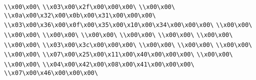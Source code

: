 \verb|\\x00\x00\|\newline
\verb|\\x03\x00\x2f\x00\x00\x00\|\newline
\verb|\\x00\x00\|\newline
\verb|\\x0a\x00\x32\x00\x0b\x00\x31\x00\x00\x00\|\newline
\verb|\\x03\x00\x36\x00\x0f\x00\x35\x00\x10\x00\x34\x00\x00\x00\|\newline
\verb|\\x00\x00\|\newline
\verb|\\x00\x00\|\newline
\verb|\\x00\x00\|\newline
\verb|\\x00\x00\|\newline
\verb|\\x00\x00\|\newline
\verb|\\x00\x00\|\newline
\verb|\\x00\x00\|\newline
\verb|\\x00\x00\|\newline
\verb|\\x03\x00\x3c\x00\x00\x00\|\newline
\verb|\\x00\x00\|\newline
\verb|\\x00\x00\|\newline
\verb|\\x00\x00\|\newline
\verb|\\x00\x00\|\newline
\verb|\\x07\x00\x25\x00\x11\x00\x40\x00\x00\x00\|\newline
\verb|\\x00\x00\|\newline
\verb|\\x00\x00\|\newline
\verb|\\x04\x00\x42\x00\x08\x00\x41\x00\x00\x00\|\newline
\verb|\\x07\x00\x46\x00\x00\x00\|\newline
